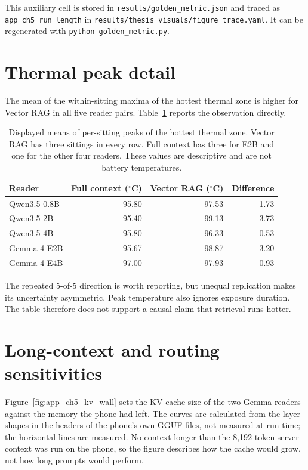 This auxiliary cell is stored in \texttt{results/golden\_metric.json} and traced as
\texttt{app\_ch5\_run\_length} in
\texttt{results/thesis\_visuals/figure\_trace.yaml}. It can be regenerated with
\texttt{python golden\_metric.py}.

\section{Thermal peak detail}
\label{app:ch5_thermal}

The mean of the within-sitting maxima of the hottest thermal zone is higher for Vector RAG in
all five reader pairs. Table~\ref{tab:app_ch5_thermal} reports the observation directly.

\begin{table}[htbp]
  \centering
  \small
  \begin{tabular}{lrrr}
    \toprule
    Reader & Full context ($^\circ$C) & Vector RAG ($^\circ$C) & Difference \\
    \midrule
    Qwen3.5 0.8B & 95.80 & 97.53 & 1.73 \\
    Qwen3.5 2B   & 95.40 & 99.13 & 3.73 \\
    Qwen3.5 4B   & 95.80 & 96.33 & 0.53 \\
    Gemma 4 E2B  & 95.67 & 98.87 & 3.20 \\
    Gemma 4 E4B  & 97.00 & 97.93 & 0.93 \\
    \bottomrule
  \end{tabular}
  \caption{Displayed means of per-sitting peaks of the hottest thermal zone. Vector RAG has three
  sittings in every row. Full context has three for E2B and one for the other four
  readers. These values are descriptive and are not battery temperatures.}
  \label{tab:app_ch5_thermal}
\end{table}

The repeated 5-of-5 direction is worth reporting, but unequal replication makes its
uncertainty asymmetric. Peak temperature also ignores exposure duration. The table
therefore does not support a causal claim that retrieval runs hotter.

\section{Long-context and routing sensitivities}
\label{app:ch5_routing_sensitivity}

Figure~\ref{fig:app_ch5_kv_wall} sets the KV-cache size of the two Gemma readers against the
memory the phone had left. The curves are calculated from the layer shapes in the headers of the
phone's own GGUF files, not measured at run time; the horizontal lines are measured. No context
longer than the 8,192-token server context was run on the phone, so the figure describes how the
cache would grow, not how long prompts would perform.

